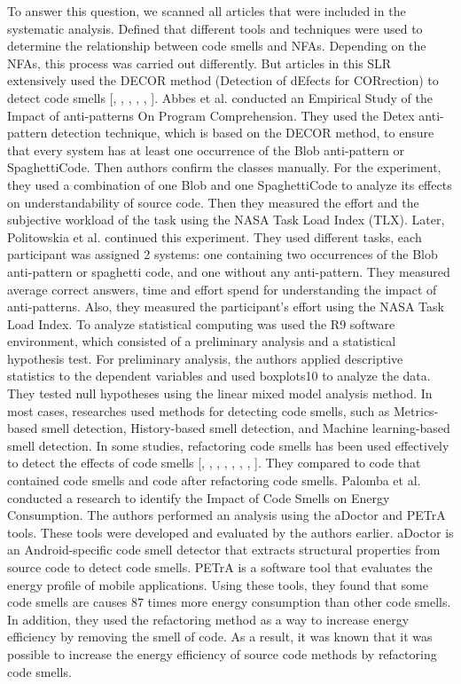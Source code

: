 \documentclass{sigchi}
\begin{document}
To answer this question, we scanned all articles that were included in the systematic analysis. Defined that different tools and techniques were used to determine the relationship between code smells and NFAs. Depending on the NFAs, this process was carried out differently. But  articles in this SLR extensively used the DECOR method (Detection of dEfects for CORrection) to detect code smells [\cite{Abbes}, \cite{Khomh}, \cite{Romano}, \cite{Romano}, \cite{Jaafar}, \cite{Politowskia}]. Abbes et al. \cite{Abbes} conducted an Empirical Study of the Impact of anti-patterns On Program Comprehension. They used the Detex anti-pattern detection technique, which is based on the DECOR method, to ensure that every system has at least one occurrence of the Blob anti-pattern or SpaghettiCode. Then authors confirm the classes manually. For the experiment, they used a combination of one Blob and one SpaghettiCode to analyze its effects on understandability of source code. Then they measured the effort and the subjective workload of the task using the NASA Task Load Index (TLX). Later, Politowskia et al. \cite{Politowskia} continued this experiment. They used different tasks, each participant was assigned 2 systems: one containing two occurrences of the Blob anti-pattern or spaghetti code, and one without any anti-pattern. They measured average correct answers, time and effort spend for understanding the impact of anti-patterns. Also, they measured the participant's effort using the NASA Task Load Index. To analyze statistical computing was used the R9 software environment, which consisted of a preliminary analysis and a statistical hypothesis test. For preliminary analysis, the authors applied descriptive statistics to the dependent variables and used boxplots10 to analyze the data. They tested null hypotheses using the linear mixed model analysis method. In most cases, researches used methods for detecting code smells, such as Metrics-based smell detection, History-based smell detection, and Machine learning-based smell detection. In some studies, refactoring code smells has been used effectively to detect the effects of code smells [\cite{Zazworka}, \cite{Sabane}, \cite{Sjoberg}, \cite{Hall}, \cite{Islam}, \cite{Carette}, \cite{Verdecchia}, \cite{Palomba3}]. They compared to code that contained code smells and code after refactoring code smells. Palomba et al. \cite{Palomba3} conducted a research to identify the Impact of Code Smells on Energy Consumption. The authors performed an analysis using the aDoctor and PETrA tools. These tools were developed and evaluated by the authors earlier. aDoctor is an Android-specific code smell detector that extracts structural properties from source code to detect code smells. PETrA is a software tool that evaluates the energy profile of mobile applications. Using these tools, they found that some code smells are causes 87 times more energy consumption than other code smells. In addition, they used the refactoring method as a way to increase energy efficiency by removing the smell of code. As a result, it was known that it was possible to increase the energy efficiency of source code methods by refactoring code smells. 
\end{document}

